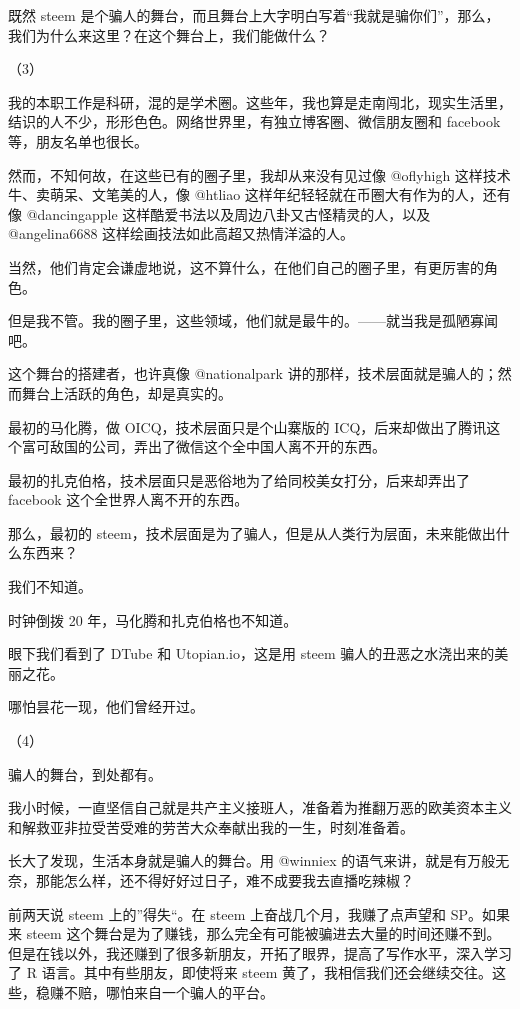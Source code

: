\documentclass[]{ctexbook}
\begin{document}
既然 steem 是个骗人的舞台，而且舞台上大字明白写着``我就是骗你们''，那么，我们为什么来这里？在这个舞台上，我们能做什么？

（3）

我的本职工作是科研，混的是学术圈。这些年，我也算是走南闯北，现实生活里，结识的人不少，形形色色。网络世界里，有独立博客圈、微信朋友圈和 facebook 等，朋友名单也很长。

然而，不知何故，在这些已有的圈子里，我却从来没有见过像 @oflyhigh 这样技术牛、卖萌呆、文笔美的人，像 @htliao 这样年纪轻轻就在币圈大有作为的人，还有像 @dancingapple 这样酷爱书法以及周边八卦又古怪精灵的人，以及 @angelina6688 这样绘画技法如此高超又热情洋溢的人。

当然，他们肯定会谦虚地说，这不算什么，在他们自己的圈子里，有更厉害的角色。

但是我不管。我的圈子里，这些领域，他们就是最牛的。------就当我是孤陋寡闻吧。

这个舞台的搭建者，也许真像 @nationalpark 讲的那样，技术层面就是骗人的；然而舞台上活跃的角色，却是真实的。

最初的马化腾，做 OICQ，技术层面只是个山寨版的 ICQ，后来却做出了腾讯这个富可敌国的公司，弄出了微信这个全中国人离不开的东西。

最初的扎克伯格，技术层面只是恶俗地为了给同校美女打分，后来却弄出了 facebook 这个全世界人离不开的东西。

那么，最初的 steem，技术层面是为了骗人，但是从人类行为层面，未来能做出什么东西来？

我们不知道。

时钟倒拨 20 年，马化腾和扎克伯格也不知道。

眼下我们看到了 DTube 和 Utopian.io，这是用 steem 骗人的丑恶之水浇出来的美丽之花。

哪怕昙花一现，他们曾经开过。

（4）

骗人的舞台，到处都有。

我小时候，一直坚信自己就是共产主义接班人，准备着为推翻万恶的欧美资本主义和解救亚非拉受苦受难的劳苦大众奉献出我的一生，时刻准备着。

长大了发现，生活本身就是骗人的舞台。用 @winniex 的语气来讲，就是有万般无奈，那能怎么样，还不得好好过日子，难不成要我去直播吃辣椒？

前两天说 steem 上的''得失``。在 steem 上奋战几个月，我赚了点声望和 SP。如果来 steem 这个舞台是为了赚钱，那么完全有可能被骗进去大量的时间还赚不到。但是在钱以外，我还赚到了很多新朋友，开拓了眼界，提高了写作水平，深入学习了 R 语言。其中有些朋友，即使将来 steem 黄了，我相信我们还会继续交往。这些，稳赚不赔，哪怕来自一个骗人的平台。
\end{document}

